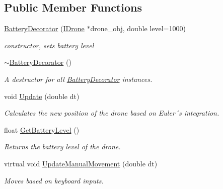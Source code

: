\subsection*{Public Member Functions}
\begin{DoxyCompactItemize}
\item 
\hyperlink{classBatteryDecorator_a4bf9b42cd8a12a058107911c6a8ce2cf}{Battery\+Decorator} (\hyperlink{classIDrone}{I\+Drone} $\ast$drone\+\_\+obj, double level=1000)
\begin{DoxyCompactList}\small\item\em constructor, sets battery level \end{DoxyCompactList}\item 
\mbox{\label{classBatteryDecorator_a0036d03d5fc869eb39e55734d1e5bb87}} 
\hyperlink{classBatteryDecorator_a0036d03d5fc869eb39e55734d1e5bb87}{$\sim$\+Battery\+Decorator} ()
\begin{DoxyCompactList}\small\item\em A destructor for all \hyperlink{classBatteryDecorator}{Battery\+Decorator} instances. \end{DoxyCompactList}\item 
void \hyperlink{classBatteryDecorator_a92ea38b63e41d61d7392cb58a53fa8d9}{Update} (double dt)
\begin{DoxyCompactList}\small\item\em Calculates the new position of the drone based on Euler´s integration. \end{DoxyCompactList}\item 
\mbox{\label{classBatteryDecorator_abf1c1655d13fbaae30cc31b56dcb18c7}} 
float \hyperlink{classBatteryDecorator_abf1c1655d13fbaae30cc31b56dcb18c7}{Get\+Battery\+Level} ()
\begin{DoxyCompactList}\small\item\em Returns the battery level of the drone. \end{DoxyCompactList}\item 
virtual void \hyperlink{classBatteryDecorator_a45babf9bc5484acb95701d361e89de9b}{Update\+Manual\+Movement} (double dt)
\begin{DoxyCompactList}\small\item\em Moves based on keyboard inputs. \end{DoxyCompactList}\item 
\mbox{\label{classBatteryDecorator_a36bd4557608043a6934b8c5d73ad511e}} 

\end{DoxyCompactItemize}
